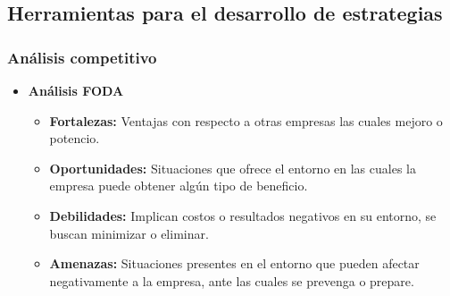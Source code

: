\documentclass{templateNote}
\begin{document}
\subsection{Herramientas para el desarrollo de estrategias}

\subsubsection{Análisis competitivo}
    \begin{itemize}
        \item \textbf{Análisis FODA}
        \begin{itemize}
            \item \textbf{Fortalezas:} Ventajas con respecto a otras empresas las cuales mejoro o potencio.
            \item \textbf{Oportunidades:} Situaciones que ofrece el entorno en las cuales la empresa puede obtener algún tipo de beneficio.
            \item \textbf{Debilidades:} Implican costos o resultados negativos en su entorno, se buscan minimizar o eliminar.
            \item \textbf{Amenazas:} Situaciones presentes en el entorno que pueden afectar negativamente a la empresa, ante las cuales se prevenga o prepare.
        \end{itemize}
    \end{itemize}
\end{document}
